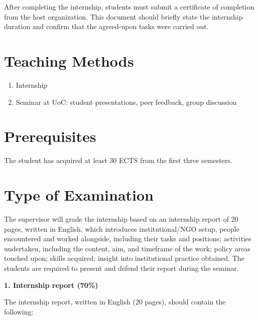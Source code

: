 \documentclass[
  letterpaper,
  10pt,
  openany]{book}
\providecommand{\tightlist}{%
  \setlength{\itemsep}{0pt}\setlength{\parskip}{0pt}}\usepackage{longtable,booktabs,array}
\begin{document}
After completing the internship, students must submit a certificate of
completion from the host organization. This document should briefly
state the internship duration and confirm that the agreed-upon tasks
were carried out.

\section*{Teaching Methods}\label{teaching-methods-6}


\begin{enumerate}
\def\labelenumi{\alph{enumi})}
\tightlist
\item
  Internship\\
\item
  Seminar at UoC: student presentations, peer feedback, group discussion
\end{enumerate}

\section*{Prerequisites}\label{prerequisites-6}


The student has acquired at least 30 ECTS from the first three
semesters.

\section*{Type of Examination}\label{type-of-examination-6}


The supervisor will grade the internship based on an internship report
of 20 pages, written in English, which introduces institutional/NGO
setup, people encountered and worked alongside, including their tasks
and positions; activities undertaken, including the content, aim, and
timeframe of the work; policy areas touched upon; skills acquired;
insight into institutional practice obtained. The students are required
to present and defend their report during the seminar.

\textbf{1. Internship report (70\%)}

The internship report, written in English (20 pages), should contain the
following:
\end{document}
